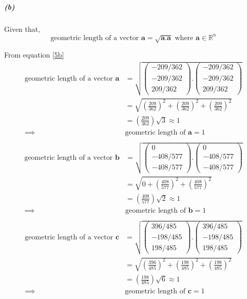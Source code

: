 \documentclass[12pt, letterpaper]{article}
\begin{document}
\subparagraph{(b)}
Given that,
\begin{equation}
\label{5b}
\text{geometric length of a vector }\mathbf{a} = \sqrt{\mathbf{a.a}}\text{ where }\mathbf{a}\in\mathbb{R}^n
\end{equation}

From equation \ref{5b}
\[\begin{split}
  \text{geometric length of a vector }\mathbf{a}
  &= \sqrt{\begin{pmatrix} -209/362\\-209/362\\209/362 \end{pmatrix}
  .\begin{pmatrix} -209/362\\-209/362\\209/362 \end{pmatrix}}\\
  &= \sqrt{\left(\frac{209}{362}\right)^2 + \left(\frac{209}{362}\right)^2 + \left(\frac{209}{362}\right)^2}\\
  &= \left(\frac{209}{362}\right)\sqrt{3} \approx 1\\
  \implies &\boxed{\text{geometric length of }\mathbf{a} = 1}\\
\end{split} \]
\[\begin{split}
  \text{geometric length of a vector }\mathbf{b}
  &= \sqrt{\begin{pmatrix} 0\\-408/577\\-408/577 \end{pmatrix}
  .\begin{pmatrix} 0\\-408/577\\-408/577 \end{pmatrix}}\\
  &= \sqrt{0 + \left(\frac{408}{577}\right)^2 + \left(\frac{408}{577}\right)^2}\\
  &= \left(\frac{408}{577}\right)\sqrt{2} \approx 1\\
  \implies &\boxed{\text{geometric length of }\mathbf{b} = 1}\\
\end{split} \]
\[\begin{split}
  \text{geometric length of a vector }\mathbf{c}
  &= \sqrt{\begin{pmatrix} 396/485\\-198/485\\198/485 \end{pmatrix}
  .\begin{pmatrix} 396/485\\-198/485\\198/485 \end{pmatrix}}\\
  &= \sqrt{\left(\frac{396}{485}\right)^2 + \left(\frac{198}{485}\right)^2 + \left(\frac{198}{485}\right)^2}\\
  &= \left(\frac{198}{485}\right)\sqrt{6} \approx 1\\
  \implies &\boxed{\text{geometric length of }\mathbf{c} = 1}\\
\end{split} \]
\end{document}
